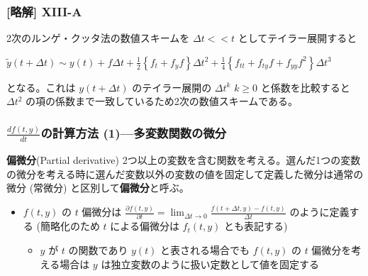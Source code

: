 \documentclass[dvipdfmx,aspectratio=169,20pt]{beamer}
\newcommand{\myfontsetting}[3]{{\fontsize{#1}{#2}\selectfont #3}}
\begin{document}
\begin{frame}
\frametitle{[略解] X\hspace{-.1em}I\hspace{-.1em}I\hspace{-.1em}I-A}

\myfontsetting{18pt}{18pt}{2次のルンゲ・クッタ法の数値スキームを $\varDelta t << t$ としてテイラー展開すると

\vspace{5mm}

\myfontsetting{15pt}{15pt}{$\tilde{y}(t+\varDelta t) \sim y(t) + f\varDelta t + \frac{1}{2}\left\{ f_t + f_y f \right\}\varDelta t^2 + \frac{1}{4} \left\{ f_{tt} + f_{ty} f + f_{yy} f^2 \right\} \varDelta t^3$}

\vspace{5mm}

となる。これは $y(t+\varDelta t)$ のテイラー展開の $\varDelta t^k$ $k \ge 0$ と係数を比較すると $\varDelta t^2$ の項の係数まで一致しているため2次の数値スキームである。}

\end{frame}
\begin{frame}
\frametitle{\large \myfontsetting{20pt}{20pt}{$ \frac{df(t,y)}{dt}$}の計算方法 (1)---多変数関数の微分}
\begin{block}{\myfontsetting{20pt}{20pt}{\bf 偏微分}{\small (Partial derivative)}}
\myfontsetting{14pt}{16pt}{
2つ以上の変数を含む関数を考える。選んだ1つの変数の微分を考える時に選んだ変数以外の変数の値を固定して定義した微分は通常の微分 (常微分) と区別して{\bf 偏微分}と呼ぶ。
}
\end{block}
\begin{itemize}
    \item \myfontsetting{14pt}{16pt}{$f(t,y)$ の $t$ 偏微分は \myfontsetting{10pt}{10pt}{$\displaystyle \frac{\partial f(t,y)}{\partial t} = \lim_{\varDelta t\to 0} \frac{f(t+\varDelta t,y) - f(t,y)}{\varDelta t}$} のように定義する \myfontsetting{10pt}{10pt}{(簡略化のため $t$ による偏微分は $f_t(t,y)$ とも表記する)}}
    \begin{itemize}
        \item \myfontsetting{12pt}{14pt}{$y$ が $t$ の関数であり $y(t)$ と表される場合でも $f(t,y)$ の $t$ 偏微分を考える場合は $y$ は独立変数のように扱い定数として値を固定する}
    \end{itemize}
\end{itemize}
\end{frame}
\end{document}
